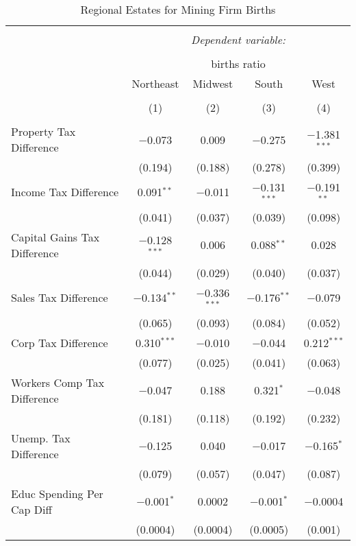 
\begin{table}[!htbp] \centering 
  \caption{Regional Estates for  Mining Firm Births} 
  \label{} 
\begin{tabular}{@{\extracolsep{5pt}}lcccc} 
\\[-1.8ex]\hline 
\hline \\[-1.8ex] 
 & \multicolumn{4}{c}{\textit{Dependent variable:}} \\ 
\cline{2-5} 
\\[-1.8ex] & \multicolumn{4}{c}{births ratio} \\ 
 & Northeast & Midwest & South & West \\ 
\\[-1.8ex] & (1) & (2) & (3) & (4)\\ 
\hline \\[-1.8ex] 
 Property Tax Difference & $-$0.073 & 0.009 & $-$0.275 & $-$1.381$^{***}$ \\ 
  & (0.194) & (0.188) & (0.278) & (0.399) \\ 
  Income Tax Difference & 0.091$^{**}$ & $-$0.011 & $-$0.131$^{***}$ & $-$0.191$^{**}$ \\ 
  & (0.041) & (0.037) & (0.039) & (0.098) \\ 
  Capital Gains Tax Difference & $-$0.128$^{***}$ & 0.006 & 0.088$^{**}$ & 0.028 \\ 
  & (0.044) & (0.029) & (0.040) & (0.037) \\ 
  Sales Tax Difference & $-$0.134$^{**}$ & $-$0.336$^{***}$ & $-$0.176$^{**}$ & $-$0.079 \\ 
  & (0.065) & (0.093) & (0.084) & (0.052) \\ 
  Corp Tax Difference & 0.310$^{***}$ & $-$0.010 & $-$0.044 & 0.212$^{***}$ \\ 
  & (0.077) & (0.025) & (0.041) & (0.063) \\ 
  Workers Comp Tax Difference & $-$0.047 & 0.188 & 0.321$^{*}$ & $-$0.048 \\ 
  & (0.181) & (0.118) & (0.192) & (0.232) \\ 
  Unemp. Tax Difference & $-$0.125 & 0.040 & $-$0.017 & $-$0.165$^{*}$ \\ 
  & (0.079) & (0.057) & (0.047) & (0.087) \\ 
  Educ Spending Per Cap Diff & $-$0.001$^{*}$ & 0.0002 & $-$0.001$^{*}$ & $-$0.0004 \\ 
  & (0.0004) & (0.0004) & (0.0005) & (0.001) \\ 

\end{tabular}
\end{table}

